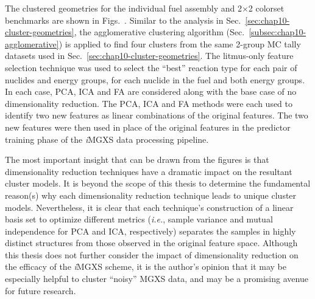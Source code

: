 \begin{appendices}
The clustered geometries for the individual fuel assembly and 2$\times$2 colorset benchmarks are shown in Figs.~. Similar to the analysis in Sec.~\ref{sec:chap10-cluster-geometries}, the agglomerative clustering algorithm (Sec.~\ref{subsec:chap10-agglomerative}) is applied to find four clusters from the same 2-group \ac{MC} tally datasets used in Sec.~\ref{sec:chap10-cluster-geometries}. The litmus-only feature selection technique was used to select the ``best'' reaction type for each pair of nuclides and energy groups, for each nuclide in the fuel and both energy groups. In each case, PCA, ICA and FA are considered along with the base case of no dimensionality reduction. The PCA, ICA and FA methods were each used to identify two new features as linear combinations of the original features. The two new features were then used in place of the original features in the predictor training phase of the \textit{i}\ac{MGXS} data processing pipeline.

The most important insight that can be drawn from the figures is that dimensionality reduction techniques have a dramatic impact on the resultant cluster models. It is beyond the scope of this thesis to determine the fundamental reason(s) why each dimensionality reduction technique leads to unique cluster models. Nevertheless, it is clear that each technique's construction of a linear basis set to optimize different metrics (\textit{i.e.}, sample variance and mutual independence for PCA and ICA, respectively) separates the samples in highly distinct structures from those observed in the original feature space. Although this thesis does not further consider the impact of dimensionality reduction on the efficacy of the \textit{i}\ac{MGXS} scheme, it is the author's opinion that it may be especially helpful to cluster ``noisy'' MGXS data, and may be a promising avenue for future research.


\end{appendices}
